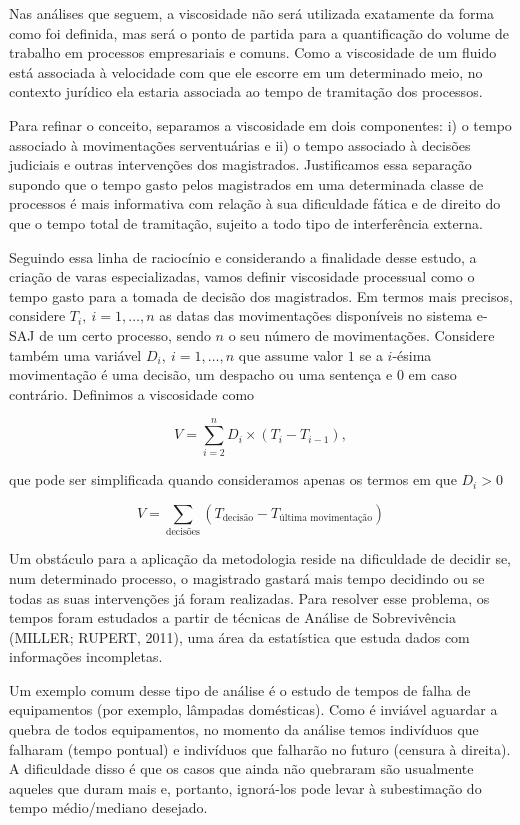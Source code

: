 \documentclass[]{book}
\begin{document}
Nas análises que seguem, a viscosidade não será utilizada exatamente da
forma como foi definida, mas será o ponto de partida para a
quantificação do volume de trabalho em processos empresariais e comuns.
Como a viscosidade de um fluido está associada à velocidade com que ele
escorre em um determinado meio, no contexto jurídico ela estaria
associada ao tempo de tramitação dos processos.

Para refinar o conceito, separamos a viscosidade em dois componentes: i)
o tempo associado à movimentações serventuárias e ii) o tempo associado
à decisões judiciais e outras intervenções dos magistrados. Justificamos
essa separação supondo que o tempo gasto pelos magistrados em uma
determinada classe de processos é mais informativa com relação à sua
dificuldade fática e de direito do que o tempo total de tramitação,
sujeito a todo tipo de interferência externa.

Seguindo essa linha de raciocínio e considerando a finalidade desse
estudo, a criação de varas especializadas, vamos definir viscosidade
processual como o tempo gasto para a tomada de decisão dos magistrados.
Em termos mais precisos, considere \(T_i, \ i = 1,\dots,n\) as datas das
movimentações disponíveis no sistema e-SAJ de um certo processo, sendo
\(n\) o seu número de movimentações. Considere também uma variável
\(D_i, \ i = 1,\dots,n\) que assume valor \(1\) se a \(i\)-ésima
movimentação é uma decisão, um despacho ou uma sentença e \(0\) em caso
contrário. Definimos a viscosidade como

\[ 
V = \sum\limits_{i=2}^n D_i \times (T_i - T_{i-1}), 
\]

\noindent que pode ser simplificada quando consideramos apenas os termos
em que \(D_i > 0\)

\[ 
V = \sum\limits_{\text{decisões}} (T_{\text{decisão}} - T_{\text{última movimentação}})
\]

Um obstáculo para a aplicação da metodologia reside na dificuldade de
decidir se, num determinado processo, o magistrado gastará mais tempo
decidindo ou se todas as suas intervenções já foram realizadas. Para
resolver esse problema, os tempos foram estudados a partir de técnicas
de Análise de Sobrevivência (MILLER; RUPERT, 2011), uma área da
estatística que estuda dados com informações incompletas.

Um exemplo comum desse tipo de análise é o estudo de tempos de falha de
equipamentos (por exemplo, lâmpadas domésticas). Como é inviável
aguardar a quebra de todos equipamentos, no momento da análise temos
indivíduos que falharam (tempo pontual) e indivíduos que falharão no
futuro (censura à direita). A dificuldade disso é que os casos que ainda
não quebraram são usualmente aqueles que duram mais e, portanto,
ignorá-los pode levar à subestimação do tempo médio/mediano desejado.
\end{document}

